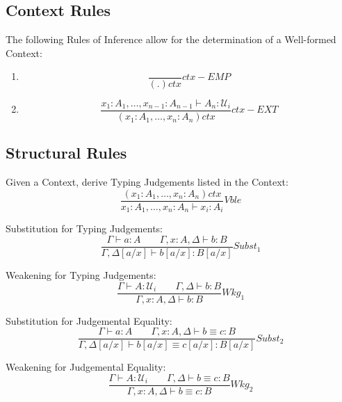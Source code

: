 \subsection{Context Rules}

The following Rules of Inference allow for the determination of a
Well-formed Context:
\begin{enumerate}
\item
\[
    {
        \frac{}{(.)ctx}
    } ctx-EMP
\]
\item
\[
    {
        \frac
        {x_1:A_1, \ldots, x_{n-1}:A_{n-1} \vdash A_n : \mathcal{U}_i}
        {(x_1:A_1,\ldots,x_n:A_n) ctx}
    } ctx-EXT
\]
\end{enumerate}



\subsection{Structural Rules}

Given a Context, derive Typing Judgements listed in the Context:
\[
    {
        \frac
        {(x_1:A_1, \ldots, x_n:A_n)ctx}
        {x_1:A_1, \ldots, x_n:A_n \vdash x_i:A_i}
    } Vble
\]

Substitution for Typing Judgements:
\[
    {
        \frac
        {\Gamma \vdash a : A \;\;\;\;\;\;\;
        \Gamma,x:A,\Delta \vdash b : B}
        {\Gamma,\Delta[a/x] \vdash b[a/x] : B[a/x]}
    } Subst_1
\]

Weakening for Typing Judgements:
\[
    {
        \frac
        {\Gamma \vdash A : \mathcal{U}_i \;\;\;\;\;\;\;
        \Gamma,\Delta \vdash b : B}
        {\Gamma,x:A,\Delta \vdash b:B}
    } Wkg_1
\]

Substitution for Judgemental Equality:
\[
    {
        \frac
        {\Gamma \vdash a : A \;\;\;\;\;\;\;
        \Gamma,x:A,\Delta \vdash b \equiv c : B}
        {\Gamma,\Delta[a/x] \vdash b[a/x] \equiv c[a/x] : B[a/x]}
    } Subst_2
\]

Weakening for Judgemental Equality:
\[
    {
        \frac
        {\Gamma \vdash A : \mathcal{U}_i \;\;\;\;\;\;\;
        \Gamma,\Delta \vdash b \equiv c : B}
        {\Gamma, x:A, \Delta \vdash b \equiv c : B}
    } Wkg_2
\]



